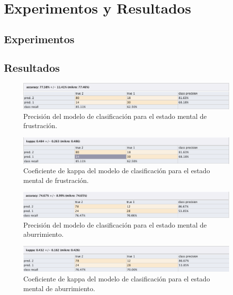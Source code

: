 
\chapter{Experimentos y Resultados}


\section{Experimentos}


\section{Resultados}

\begin{figure}[htp]
  \centerline{\includegraphics[width=16.09cm]{frustration-accuracy.png}} \caption{Precisión
    del modelo de clasificación para el estado mental de frustración.
} \label{frustration-accuracy}
\end{figure}

\begin{figure}[htp]
  \centerline{\includegraphics[width=16.09cm]{frustration-kappa.png}} \caption{Coeficiente
    de kappa del modelo de clasificación para el estado mental de frustración.
} \label{frustration-kappa}
\end{figure}


\begin{figure}[htp]
  \centerline{\includegraphics[width=16.09cm]{boredom-accuracy.png}} \caption{Precisión
    del modelo de clasificación para el estado mental de aburrimiento.
} \label{frustration-accuracy}
\end{figure}

\begin{figure}[htp]
  \centerline{\includegraphics[width=16.09cm]{boredom-kappa.png}} \caption{Coeficiente
    de kappa del modelo de clasificación para el estado mental de aburrimiento.
} \label{frustration-kappa}
\end{figure}